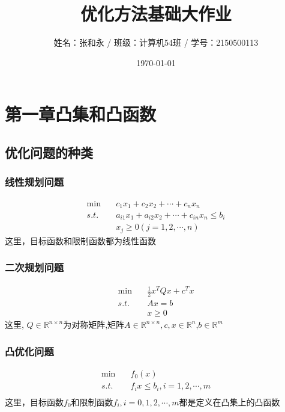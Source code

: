 \documentclass[UTF8]{article}
\title{ 优化方法基础大作业 }
\author{姓名：张和永 / 班级：计算机54班 / 学号：2150500113}
\date{\today}
\begin{document}
\maketitle
\setcounter{tocdepth}{10}
\tableofcontents
\newpage


\section{第一章\quad 凸集和凸函数}
\subsection{优化问题的种类} 

		\subsubsection{ 线性规划问题}
	
			\begin{displaymath}
	\begin{aligned}
			\min\quad & c_{1}x_{1}+c_{2}x_{2}+ \cdots +c_{n}x_{n}\\
			s.t. \quad & a_{i1}x_{1}+a_{i2}x_{2}+ \cdots +c_{in}x_{n}\leq b_{i}\\
				& x_{j} \geq 0(j = 1,2,\cdots,n)
			\end{aligned}
	\end{displaymath}
			这里，目标函数和限制函数都为线性函数

		\subsubsection{二次规划问题}
		\begin{displaymath}
	\begin{aligned}
			\min\quad & \frac{1}{2} x^{T}Qx + c^{T}x\\
			s.t. \quad & Ax = b \\
				& x \geq 0
			\end{aligned}
	\end{displaymath}
		这里, $Q \in \mathbb{R}^{n\times n}$为对称矩阵,矩阵$A\in \mathbb{R}^{n\times n},c,x \in \mathbb{R}^{n}$,$b \in \mathbb{R}^{m}$
		\subsubsection{凸优化问题}
	\begin{displaymath}
	\begin{aligned}
			\min\quad & f_{0}(x)\\
			s.t. \quad & f_i{x} \leq b_{i}, i=1,2,\cdots,m \\
			\end{aligned}
	\end{displaymath}
	这里，目标函数$f_{0}$和限制函数$f_{i},i=0,1,2,\cdots,m$都是定义在凸集上的凸函数
	
\end{document}
